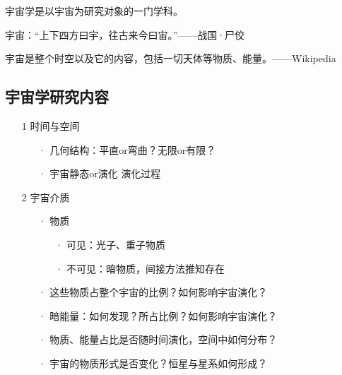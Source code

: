 \par 
宇宙学是以宇宙为研究对象的一门学科。
\par 
宇宙：“上下四方曰宇，往古来今曰宙。”——战国·尸佼
\par 
宇宙是整个时空以及它的内容，包括一切天体等物质、能量。——Wikipedia

\subsection{宇宙学研究内容}
\begin{itemize}
	\item[1] 时间与空间
		\begin{itemize}
			\item[·] 几何结构：平直or弯曲？无限or有限？
			\item[·] 宇宙静态or演化 \quad 演化过程
		\end{itemize}
	\item[2] 宇宙介质
		\begin{itemize}
			\item[·] 物质
				\begin{itemize}
					\item[·] 可见：光子、重子物质
					\item[·] 不可见：暗物质，间接方法推知存在
				\end{itemize}
			\item[·] 这些物质占整个宇宙的比例？如何影响宇宙演化？
			\item[·] 暗能量：如何发现？所占比例？如何影响宇宙演化？
			\item[·] 物质、能量占比是否随时间演化，空间中如何分布？
			\item[·] 宇宙的物质形式是否变化？恒星与星系如何形成？
		\end{itemize}
\end{itemize}

